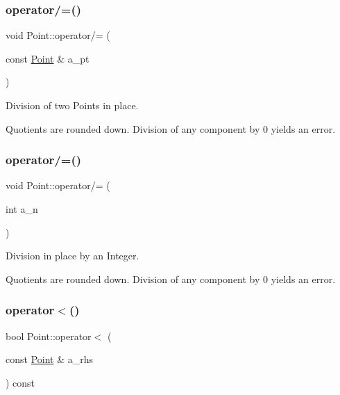 \subsubsection{\texorpdfstring{operator/=()}{operator/=()}\hspace{0.1cm}{\footnotesize\ttfamily [1/2]}}
{\footnotesize\ttfamily void Point\+::operator/= (\begin{DoxyParamCaption}\item[{const \hyperlink{class_point}{Point} \&}]{a\+\_\+pt }\end{DoxyParamCaption})\hspace{0.3cm}{\ttfamily [inline]}}



Division of two Points in place. 

Quotients are rounded down. Division of any component by 0 yields an error. \mbox{\label{class_point_a62ab14874fced136ff69ed4cf6d34c90}} 
\subsubsection{\texorpdfstring{operator/=()}{operator/=()}\hspace{0.1cm}{\footnotesize\ttfamily [2/2]}}
{\footnotesize\ttfamily void Point\+::operator/= (\begin{DoxyParamCaption}\item[{int}]{a\+\_\+n }\end{DoxyParamCaption})\hspace{0.3cm}{\ttfamily [inline]}}



Division in place by an Integer. 

Quotients are rounded down. Division of any component by 0 yields an error. \mbox{\label{class_point_ab93641cb4a786c87778c63ad23e9ec0b}} 
\subsubsection{\texorpdfstring{operator$<$()}{operator<()}}
{\footnotesize\ttfamily bool Point\+::operator$<$ (\begin{DoxyParamCaption}\item[{const \hyperlink{class_point}{Point} \&}]{a\+\_\+rhs }\end{DoxyParamCaption}) const\hspace{0.3cm}{\ttfamily [inline]}}



